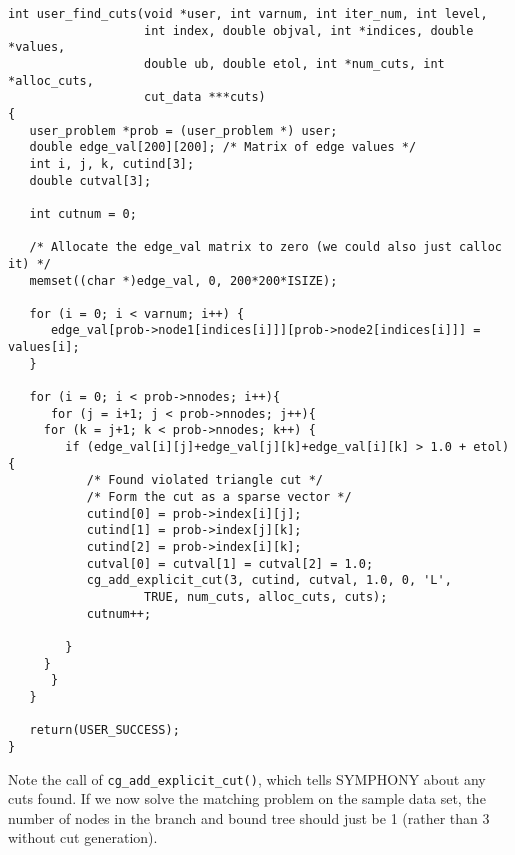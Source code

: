 \documentclass[11pt]{article}
\begin{document}
\begin{verbatim}
int user_find_cuts(void *user, int varnum, int iter_num, int level,
                   int index, double objval, int *indices, double *values,
                   double ub, double etol, int *num_cuts, int *alloc_cuts, 
                   cut_data ***cuts)
{
   user_problem *prob = (user_problem *) user;
   double edge_val[200][200]; /* Matrix of edge values */
   int i, j, k, cutind[3];
   double cutval[3];
   
   int cutnum = 0;

   /* Allocate the edge_val matrix to zero (we could also just calloc it) */
   memset((char *)edge_val, 0, 200*200*ISIZE);
   
   for (i = 0; i < varnum; i++) {
      edge_val[prob->node1[indices[i]]][prob->node2[indices[i]]] = values[i];
   }
   
   for (i = 0; i < prob->nnodes; i++){
      for (j = i+1; j < prob->nnodes; j++){
	 for (k = j+1; k < prob->nnodes; k++) {
	    if (edge_val[i][j]+edge_val[j][k]+edge_val[i][k] > 1.0 + etol) {
	       /* Found violated triangle cut */
	       /* Form the cut as a sparse vector */
	       cutind[0] = prob->index[i][j];
	       cutind[1] = prob->index[j][k];
	       cutind[2] = prob->index[i][k];
	       cutval[0] = cutval[1] = cutval[2] = 1.0;
	       cg_add_explicit_cut(3, cutind, cutval, 1.0, 0, 'L',
				   TRUE, num_cuts, alloc_cuts, cuts);
	       cutnum++;
	       
	    }
	 }
      }
   }

   return(USER_SUCCESS);
}

\end{verbatim}

Note the call of \texttt{cg\_add\_explicit\_cut()}, which tells SYMPHONY about
any cuts found. If we now solve the matching problem on the sample data set,
the number of nodes in the branch and bound tree should just be 1 (rather than
3 without cut generation).
\end{document}
